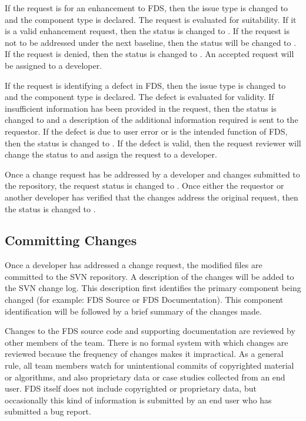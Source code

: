 \documentclass[11pt]{book}
\begin{document}
If the request is for an enhancement to FDS, then the issue type is changed to  and the component type is declared. The request is evaluated for suitability.  If it is a valid enhancement request, then the status is changed to .  If the request is not to be addressed under the next baseline, then the status will be changed to .  If the request is denied, then the status is changed to .  An accepted request will be assigned to a developer.

If the request is identifying a defect in FDS, then the issue type is changed to  and the component type is declared.  The defect is evaluated for validity.  If insufficient information has been provided in the request, then the status is changed to  and a description of the additional information required is sent to the requestor.  If the defect is due to user error or is the intended function of FDS, then the status is changed to .  If the defect is valid, then the request reviewer will change the status to  and assign the request to a developer.

Once a change request has be addressed by a developer and changes submitted to the repository, the request status is changed to .  Once either the requestor or another developer has verified that the changes address the original request, then the status is changed to .


\subsection{Committing Changes}

Once a developer has addressed a change request, the modified files are committed to the SVN repository.  A description of the changes will be added to the SVN change log.  This description first identifies the primary component being changed (for example: FDS Source or FDS Documentation).  This component identification will be followed by a brief summary of the changes made.

Changes to the FDS source code and supporting documentation are reviewed by other members of the team. There is no formal system with which changes are reviewed because the frequency of changes makes it impractical. As a general rule, all team members watch for unintentional commits of copyrighted material or algorithms, and also proprietary data or case studies collected from an end user. FDS itself does not include copyrighted or proprietary data, but occasionally this kind of information is submitted by an end user who has submitted a bug report.
\end{document}
